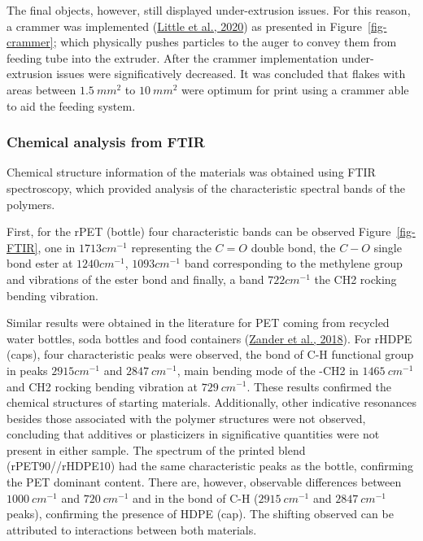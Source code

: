 \documentclass[
  12pt,
]{article}
\begin{document}
The final objects, however, still displayed under-extrusion issues. For
this reason, a crammer was implemented
(\protect\hyperlink{ref-little2020}{Little et al., 2020}) as presented
in Figure~\ref{fig-crammer}; which physically pushes particles to the
auger to convey them from feeding tube into the extruder. After the
crammer implementation under-extrusion issues were significatively
decreased. It was concluded that flakes with areas between
\(1.5~mm^{2}\) to \(10~mm^{2}\) were optimum for print using a crammer
able to aid the feeding system.

\hypertarget{chemical-analysis-from-ftir}{%
\subsubsection{Chemical analysis from
FTIR}\label{chemical-analysis-from-ftir}}

Chemical structure information of the materials was obtained using FTIR
spectroscopy, which provided analysis of the characteristic spectral
bands of the polymers.

First, for the rPET (bottle) four characteristic bands can be observed
Figure~\ref{fig-FTIR}, one in \(1713 cm^{-1}\) representing the \(C=O\)
double bond, the \(C-O\) single bond ester at \(1240 cm^{-1}\),
\(1093 cm^{-1}\) band corresponding to the methylene group and
vibrations of the ester bond and finally, a band \(722 cm^{-1}\) the CH2
rocking bending vibration.

Similar results were obtained in the literature for PET coming from
recycled water bottles, soda bottles and food containers
(\protect\hyperlink{ref-zander2018}{Zander et al., 2018}). For rHDPE
(caps), four characteristic peaks were observed, the bond of C-H
functional group in peaks \(2915cm^{-1}\) and \(2847~cm^{-1}\), main
bending mode of the -CH2 in \(1465~cm^{-1}\) and CH2 rocking bending
vibration at \(729 ~cm^{-1}\). These results confirmed the chemical
structures of starting materials. Additionally, other indicative
resonances besides those associated with the polymer structures were not
observed, concluding that additives or plasticizers in significative
quantities were not present in either sample. The spectrum of the
printed blend (rPET90//rHDPE10) had the same characteristic peaks as the
bottle, confirming the PET dominant content. There are, however,
observable differences between \(1000 ~cm^{-1}\) and \(720 ~cm^{-1}\)
and in the bond of C-H (\(2915~cm^{-1}\) and \(2847 ~cm^{-1}\) peaks),
confirming the presence of HDPE (cap). The shifting observed can be
attributed to interactions between both materials.
\end{document}
